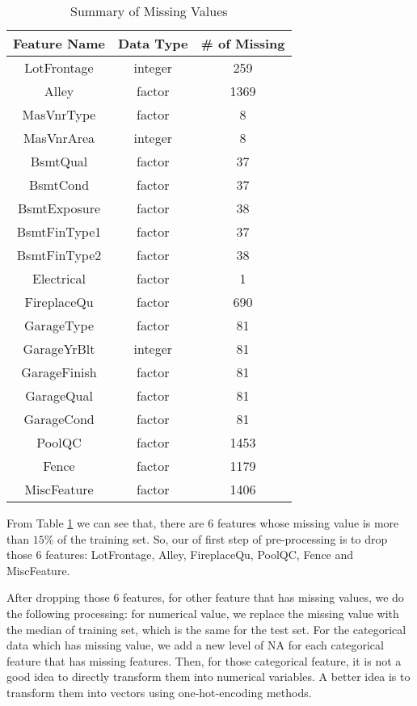 \documentclass{article}
\begin{document}
\begin{table}[htb]
 \caption{Summary of Missing Values} \label{table}
\begin{center}
  \begin{tabular}{  c  c  c }
    \hline
    Feature Name & Data Type & \# of Missing\\ \hline
    LotFrontage    & integer     & 259 \\
    Alley                & factor    & 1369 \\
    MasVnrType    & factor        & 8 \\
    MasVnrArea    & integer        & 8 \\
    BsmtQual        & factor        & 37 \\
    BsmtCond        & factor        & 37 \\
    BsmtExposure    & factor       & 38 \\
    BsmtFinType1    & factor        & 37 \\
    BsmtFinType2    & factor        & 38 \\
    Electrical            & factor        & 1 \\
    FireplaceQu        & factor        & 690 \\
    GarageType        & factor       & 81  \\
    GarageYrBlt        & integer        & 81 \\
    GarageFinish        & factor        & 81 \\
    GarageQual        & factor        & 81 \\
    GarageCond        & factor        & 81 \\
    PoolQC                & factor        & 1453 \\
    Fence                & factor        & 1179 \\
    MiscFeature        & factor        & 1406 \\
    \hline
  \end{tabular}
\end{center}
\end{table}

From Table \ref{table} we can see that, there are 6 features whose missing value is more than $15\%$ of the training set. So, our of first step of pre-processing is to drop those 6 features: LotFrontage, Alley, FireplaceQu, PoolQC, Fence and MiscFeature. 

After dropping those 6 features, for other feature that has missing values, we do the following processing: for numerical value, we replace the missing value with the median of training set, which is the same for the test set. For the categorical data which has missing value, we add a new level of NA for each categorical feature that has missing features. Then, for those categorical feature, it is not a good idea to directly transform them into numerical variables. A  better idea is to transform them into vectors using one-hot-encoding methods. 
\end{document}
